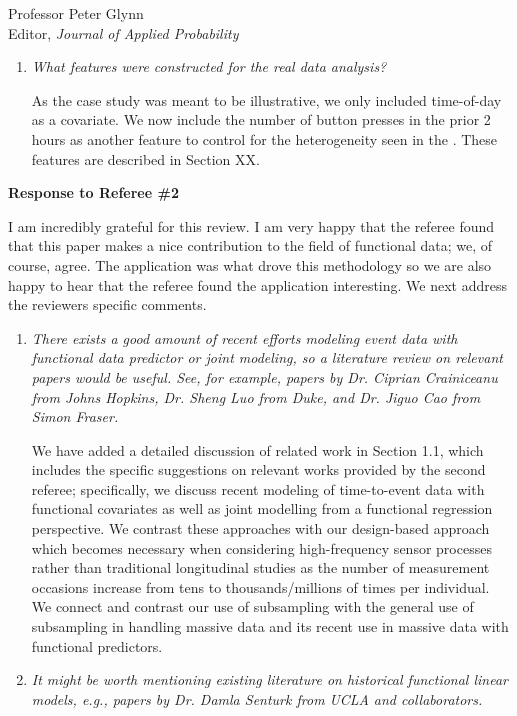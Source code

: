 \documentclass[11pt]{letter} %
\begin{document}
\begin{letter}{Professor
	Peter Glynn\\
	Editor, {\em Journal of Applied Probability}}
\begin{enumerate}
\item {\it What features were constructed for the real data analysis?}

\vspace{5mm}
As the case study was meant to be illustrative, we only included time-of-day as a covariate.  We now include the number of button presses in the prior 2 hours as another feature to control for the heterogeneity seen in the .  These features are described in Section XX.
\vspace{5mm}


\end{enumerate}

\newpage

{\bf Response to Referee \#2}

I am incredibly grateful for this review.  I am very happy that the referee found that this paper makes a nice contribution to the field of functional data; we, of course, agree. The application was what drove this methodology so we are also happy to hear that the referee found the application interesting. We next address the reviewers specific comments.

\begin{enumerate}
\item {\it There exists a good amount of recent efforts modeling event data with functional data predictor or joint modeling, so a literature review on relevant papers would be useful. See, for example, papers by Dr. Ciprian Crainiceanu from Johns Hopkins, Dr. Sheng Luo from Duke, and Dr. Jiguo Cao from Simon Fraser.}

\vspace{5mm}
We have added a detailed discussion of related work in Section 1.1, which includes the specific suggestions on relevant works provided by the second referee; specifically, we discuss recent modeling of time-to-event data with functional covariates as well as joint modelling from a functional regression perspective.  We contrast these approaches with our design-based approach which becomes necessary when considering high-frequency sensor processes rather than traditional longitudinal studies as the number of measurement occasions increase from tens to thousands/millions of times per individual.  We connect and contrast our use of subsampling with the general use of subsampling in handling massive data and its recent use in massive data with functional predictors.
\vspace{5mm}

\item {\it It might be worth mentioning existing literature on historical functional linear models, e.g., papers by Dr. Damla Senturk from UCLA and collaborators.}


\end{enumerate}
\end{letter}
\end{document}
